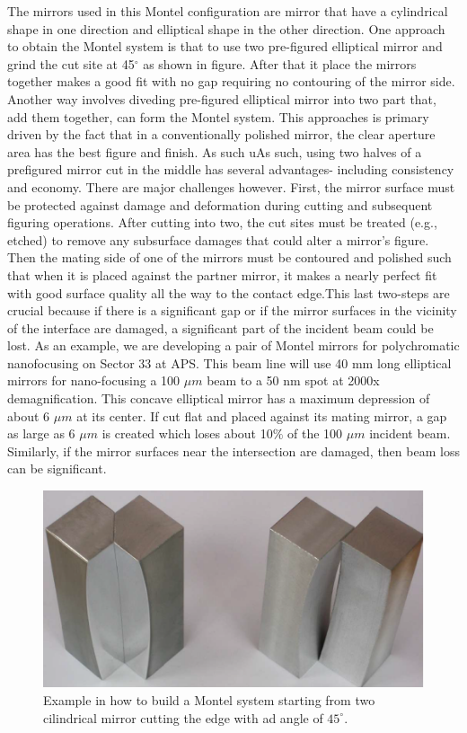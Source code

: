 The mirrors used in this Montel configuration are mirror that have a cylindrical shape in one direction and elliptical shape in the other direction. One approach to obtain the Montel system is that to use two pre-figured elliptical mirror and grind the cut site at 45$^\circ $ as shown in figure. After that it place the mirrors together makes a good fit with no gap requiring no contouring of the mirror side. Another way involves diveding pre-figured elliptical mirror into two part that, add them together, can form the Montel system. This approaches is primary driven by the fact that in a conventionally polished mirror, the clear aperture area has the best figure and finish. As such uAs such, using two halves of a prefigured mirror cut in the middle has several advantages- including consistency and economy. There are major challenges
however. First, the mirror surface must be protected against damage and deformation during cutting and subsequent figuring operations. After cutting into two, the cut sites must be treated (e.g., etched) to remove any subsurface damages that could alter a mirror's figure. Then the mating side of one of the mirrors must be contoured and polished such that when it is placed against the partner mirror, it makes a nearly perfect fit with good surface quality all the way to the contact edge.This last two-steps are crucial because if there is a significant gap or if the mirror surfaces in the vicinity of the interface are damaged, a significant part of the incident beam could be lost. As an example, we are developing a pair of Montel mirrors for polychromatic nanofocusing on Sector 33 at APS. This beam line will use 40 mm long elliptical mirrors for nano-focusing a 100 $\mu m$ beam to a 50 nm spot at 2000x demagnification. This concave elliptical mirror has a maximum depression of about 6 $\mu m$ at its center. If cut flat and placed against its mating mirror, a gap as large as 6 $\mu m$ is created which loses about 10$\% $ of the 100 $\mu m$ incident beam. Similarly, if the mirror surfaces near the intersection are damaged, then beam loss can be significant.
\begin{figure}[]
%
\centering
%
\includegraphics[width=.8\textwidth]{Immagini/Chapter2/MontelEdges}
%
\caption{Example in how to build a Montel system starting from two cilindrical mirror cutting the edge with ad angle of $45^{\circ} $.}
%
\label{fig: MontelEdges}
%
\end{figure}
